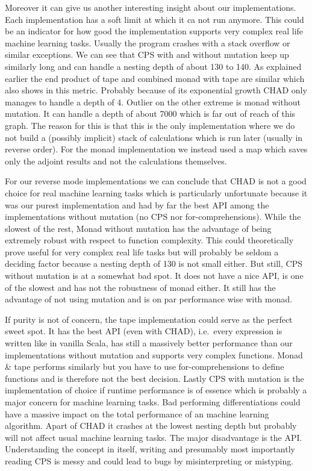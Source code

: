 Moreover it can give us another interesting insight about our implementations. Each implementation has a soft limit at which it ca not run anymore. This could be an indicator for how good the implementation supports very complex real life machine learning tasks.  Usually the program crashes with a stack overflow or similar exceptions. We can see that CPS with and without mutation keep up similarly long and can handle a nesting depth of about 130 to 140. As explained earlier the end product of tape and combined monad with tape are similar which also shows in this metric. Probably because of its exponential growth CHAD only manages to handle a depth of 4. Outlier on the other extreme is monad without mutation. It can handle a depth of about 7000 which is far out of reach of this graph. The reason for this is that this is the only implementation where we do not build a (possibly implicit) stack of calculations which is run later (usually in reverse order). For the monad implementation we instead used a map which saves only the adjoint results and not the calculations themselves.

For our reverse mode implementations we can conclude that CHAD is not a good choice for real machine learning tasks which is particularly unfortunate because it was our purest implementation and had by far the best API among the implementations without mutation (no CPS nor for-comprehensions). While the slowest of the rest, Monad without mutation has the advantage of being extremely robust with respect to function complexity. This could theoretically prove useful for very complex real life tasks but will probably be seldom a deciding factor because a nesting depth of 130 is not small either. But still, CPS without mutation is at a somewhat bad spot. It does not have a nice API, is one of the slowest and has not the robustness of monad either. It still has the advantage of not using mutation and is on par performance wise with monad.

If purity is not of concern, the tape implementation could serve as the perfect sweet spot. It has the best API (even with CHAD), i.e.\ every expression is written like in vanilla Scala, has still a massively better performance than our implementations without mutation and supports very complex functions. Monad \& tape performs similarly but you have to use for-comprehensions to define functions and is therefore not the best decision. Lastly CPS with mutation is the implementation of choice if runtime performance is of essence which is probably a major concern for machine learning tasks. Bad performing differentiations could have a massive impact on the total performance of an machine learning algorithm. Apart of CHAD it crashes at the lowest nesting depth but probably will not affect usual machine learning tasks. The major disadvantage is the API. Understanding the concept in itself, writing and presumably most importantly reading CPS is messy and could lead to bugs by misinterpreting or mistyping.

